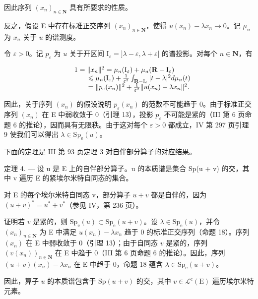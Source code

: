 因此序列 \((x_{n})_{n\in\mathbf{N}}\) 具有所要求的性质。

反之，假设 E 中存在标准正交序列 \((x_{n})_{n\in \mathbf{N}}\)，使得 \(u(x_{n}) - \lambda x_{n}\to 0\)。记 \(\mu_{n}\) 为 \(x_{n}\) 关于 \(u\) 的谱测度。

令 \(\varepsilon > 0\)。记 \(p_{\varepsilon}\) 为 \(u\) 关于开区间 \(\mathrm{I}_{\varepsilon} = ]\lambda - \varepsilon, \lambda + \varepsilon[\) 的谱投影。对每个 \(n \in \mathbf{N}\)，有

\[
\begin{array}{r l} & 1 = \| x _ {n} \| ^ {2} = \mu_ {n} (\mathrm{I} _ {\varepsilon}) + \mu_ {n} (\mathbf {R} - \mathrm{I} _ {\varepsilon}) \\ & \qquad \leqslant \mu_ {n} (\mathrm{I} _ {\varepsilon}) + \frac {1}{\varepsilon^ {2}} \int_ {\mathbf {R} - \mathrm{I} _ {\varepsilon}} | t - \lambda | ^ {2} d \mu_ {n} (t) \\ & \qquad = \| p _ {\varepsilon} (x _ {n}) \| ^ {2} + \frac {1}{\varepsilon^ {2}} \| u (x _ {n}) - \lambda x _ {n} \| ^ {2}. \end{array}
\]

因此，关于序列 \((x_{n})\) 的假设说明 \(p_{\varepsilon}(x_{n})\) 的范数不可能趋于 0。由于标准正交序列 \((x_{n})\) 在 E 中弱收敛于 0（引理 13），投影 \(p_{\varepsilon}\) 不可能是紧的（III 第 6 页命题 6 的推论），因而具有无限秩。由于这对每个 \(\varepsilon > 0\) 都成立，IV 第 297 页引理 9 使我们可以得出 \(\lambda \in \mathrm{Sp}_{\mathrm{e}}(u)\)。

下面的定理是 III 第 93 页定理 3 对自伴部分算子的对应结果。

定理 4. --- 设 u 是 E 上的自伴部分算子。u 的本质谱是集合 Sp(u + v) 的交，其中 v 遍历 E 的紧埃尔米特自同态的集合。

对 E 的每个埃尔米特自同态 v，部分算子 \(u + v\) 都是自伴的，因为 \((u + v)^{*} = u^{*} + v^{*}\)（参见 IV，第 236 页）。

证明若 \(v\) 是紧的，则 \(\mathrm{Sp_e}(u) \subset \mathrm{Sp_e}(u + v)\)。设 \(\lambda \in \mathrm{Sp_e}(u)\)，并令 \((x_n)_{n \in \mathbf{N}}\) 为 E 中满足 \(u(x_n) - \lambda x_n\) 趋于 0 的标准正交序列（命题 18）。序列 \((x_n)\) 在 E 中弱收敛于 0（引理 13）；由于自同态 \(v\) 是紧的，序列 \((v(x_n))_{n \in \mathbf{N}}\) 在 E 中趋于 0（III 第 6 页命题 6 的推论）。因此，序列 \((u+v)(x_{n})-\lambda x_{n}\) 在 E 中趋于 0，命题 18 蕴含 \(\lambda\in\mathrm{Sp}_{\mathrm{e}}(u+v)\)。

因此，算子 \(u\) 的本质谱包含于 \(\mathrm{Sp}(u + v)\) 的交，其中 \(v \in \mathcal{L}^{\mathrm{c}}(\mathrm{E})\) 遍历埃尔米特元素。

